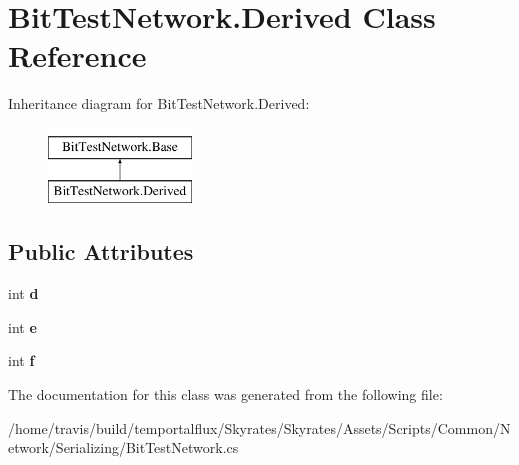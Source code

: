 \hypertarget{class_bit_test_network_1_1_derived}{\section{Bit\-Test\-Network.\-Derived Class Reference}
\label{class_bit_test_network_1_1_derived}
}
Inheritance diagram for Bit\-Test\-Network.\-Derived\-:\begin{figure}[H]
\begin{center}
\leavevmode
\includegraphics[height=2.000000cm]{class_bit_test_network_1_1_derived}
\end{center}
\end{figure}
\subsection*{Public Attributes}
\begin{DoxyCompactItemize}
\item 
\hypertarget{class_bit_test_network_1_1_derived_affbc7c2414c2e47e404ff22d245debfc}{int {\bfseries d}}\label{class_bit_test_network_1_1_derived_affbc7c2414c2e47e404ff22d245debfc}

\item 
\hypertarget{class_bit_test_network_1_1_derived_a349324c19b0733d3d72c199a6a96defd}{int {\bfseries e}}\label{class_bit_test_network_1_1_derived_a349324c19b0733d3d72c199a6a96defd}

\item 
\hypertarget{class_bit_test_network_1_1_derived_aff896c8fc37b0d103b9f0e2dca0d2bd7}{int {\bfseries f}}\label{class_bit_test_network_1_1_derived_aff896c8fc37b0d103b9f0e2dca0d2bd7}

\end{DoxyCompactItemize}


The documentation for this class was generated from the following file\-:\begin{DoxyCompactItemize}
\item 
/home/travis/build/temportalflux/\-Skyrates/\-Skyrates/\-Assets/\-Scripts/\-Common/\-Network/\-Serializing/Bit\-Test\-Network.\-cs\end{DoxyCompactItemize}

